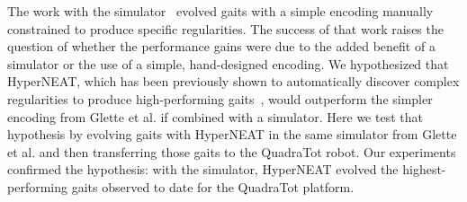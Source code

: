 The work with the simulator~\cite{glette} evolved gaits with a simple encoding manually constrained to produce specific regularities. The success of that work raises the question of whether the performance gains were due to the added benefit of a simulator or the use of a simple, hand-designed encoding. We hypothesized that HyperNEAT, which has been previously shown to automatically discover complex regularities to produce high-performing gaits~\cite{clune2011performance,yos:clune}, would outperform the simpler encoding from Glette et al. if combined with a simulator. 
Here we test that hypothesis by evolving gaits with HyperNEAT in the same simulator from Glette et al. and then transferring those gaits to the QuadraTot robot.  Our experiments confirmed the hypothesis: with the simulator, HyperNEAT evolved the highest-performing gaits observed to date for the QuadraTot platform. 




